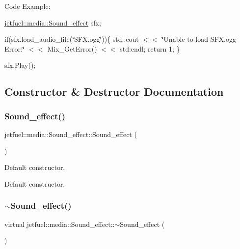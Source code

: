 Code Example\+:

\hyperlink{classjetfuel_1_1media_1_1Sound__effect}{jetfuel\+::media\+::\+Sound\+\_\+effect} sfx;

if(sfx.\+load\+\_\+audio\+\_\+file(\char`\"{}\+S\+F\+X.\+ogg\char`\"{}))\{ std\+::cout $<$$<$ \char`\"{}\+Unable to load S\+F\+X.\+ogg Error\+:\char`\"{} $<$$<$ Mix\+\_\+\+Get\+Error() $<$$<$ std\+:endl; return 1; \}

sfx.\+Play(); 

\subsection{Constructor \& Destructor Documentation}
\mbox{\label{classjetfuel_1_1media_1_1Sound__effect_a56c5c69d077a4cac1a062b391a9860fc}} 
\subsubsection{\texorpdfstring{Sound\+\_\+effect()}{Sound\_effect()}}
{\footnotesize\ttfamily jetfuel\+::media\+::\+Sound\+\_\+effect\+::\+Sound\+\_\+effect (\begin{DoxyParamCaption}{ }\end{DoxyParamCaption})}



Default constructor. 

Default constructor. \mbox{\label{classjetfuel_1_1media_1_1Sound__effect_a105547b1d854a256e90a08fcd6098bdf}} 
\subsubsection{\texorpdfstring{$\sim$\+Sound\+\_\+effect()}{~Sound\_effect()}}
{\footnotesize\ttfamily virtual jetfuel\+::media\+::\+Sound\+\_\+effect\+::$\sim$\+Sound\+\_\+effect (\begin{DoxyParamCaption}{ }\end{DoxyParamCaption})\hspace{0.3cm}{\ttfamily [virtual]}}



